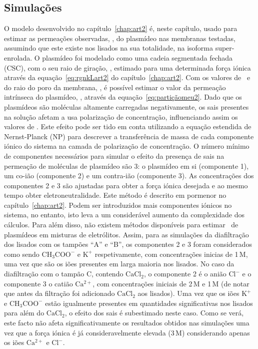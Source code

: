 \subsection{Simulações}
O modelo desenvolvido no capítulo~\ref{chap:art2} é, neste capítulo, usado para estimar as permeações observadas, \permobs, do plasmídeo nas membranas testadas, assumindo que este existe nos lisados na sua totalidade, na isoforma super-enrolada.
%
%
O plasmídeo foi modelado como uma cadeia segmentada fechada (CSC), com o seu raio de giração, \raiogiracao, estimado para uma determinada força iónica através da equação~\ref{eq:rgnkLart2} do capítulo~\ref{chap:art2}. Com os valores de \raiogiracao\ e do raio do poro da membrana, \raioporo, é possível estimar o valor da permeação intrínseca do plasmídeo, \permm, através da equação~\ref{eq:partiçãomeu2}. Dado que os plasmídeos são moléculas altamente carregadas negativamente, os sais presentes na solução afetam a usa polarização de concentração, influenciando assim os valores de \permobs. Este efeito pode ser tido em conta utilizando a equação estendida de Nernst-Planck (NP) para descrever a transferência de massa de cada componente iónico do sistema na camada de polarização de concentração.
%
O número mínimo de componentes necessários para simular o efeito da presença de sais na permeação de moléculas de plasmídeo são 3: o plasmídeo em si (componente 1), um co-ião (componente 2) e um contra-ião (componente 3). As concentrações dos componentes 2 e 3 são ajustadas para obter a força iónica desejada e ao mesmo tempo obter eletroneutralidade.
%
Este método é descrito em pormenor no capítulo~\ref{chap:art2}. Podem ser introduzidos mais componentes iónicos no sistema, no entanto, isto leva a um considerável aumento da complexidade dos cálculos. Para além disso, não existem métodos disponíveis para estimar \raiogiracao\ de plasmídeos em misturas de eletrólitos.
%
Assim, para as simulações da diafiltração dos lisados com os tampões ``A'' e ``B'', os componentes 2 e 3 foram considerados como sendo $\mathrm{CH_{3}COO^{-}}$ e $\mathrm{K^{+}}$ respetivamente, com concentrações inicias de 1\,M, uma vez que são os iões presentes em larga maioria nos lisados. No caso da diafiltração com o tampão C, contendo $\mathrm{CaCl_{2}}$, o componente 2 é o anião $\mathrm{Cl^{-}}$ e o componente 3 o catião $\mathrm{Ca^{2+}}$, com concentrações iniciais de 2\,M e 1\,M (de notar que antes da filtração foi adicionado $\mathrm{CaCl_{2}}$ aos lisados). Uma vez que os iões $\mathrm{K^{+}}$ e $\mathrm{CH_{3}COO^{-}}$ estão igualmente presentes em quantidades significativas nos lisados para além do $\mathrm{CaCl_{2}}$, o efeito dos sais é subestimado neste caso. Como se verá, este facto não afeta significativamente os resultados obtidos nas simulações uma vez que a força iónica é já consideravelmente elevada (3\,M) considerando apenas os iões $\mathrm{Ca^{2+}}$ e $\mathrm{Cl^{-}}$.

